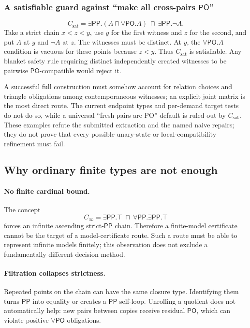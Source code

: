 \documentclass[11pt]{article}
\newcommand{\PO}{\ensuremath{\mathsf{PO}}}
\newcommand{\PP}{\ensuremath{\mathsf{PP}}}
\begin{document}
\subsubsection{A satisfiable guard against ``make all cross-pairs \PO''}

\[
C_{\mathrm{sat}}=
\exists\PP.(A\sqcap\forall\PO.A)\ \sqcap\ \exists\PP.\neg A.
\]
Take a strict chain \(x<z<y\), use \(y\) for the first witness and \(z\) for
the second, and put \(A\) at \(y\) and \(\neg A\) at \(z\).  The witnesses
must be distinct.  At \(y\), the \(\forall\PO.A\)
condition is vacuous for these points because \(z<y\).  Thus
\(C_{\mathrm{sat}}\) is satisfiable.  Any blanket safety rule requiring
distinct independently created witnesses to be pairwise \PO-compatible would
reject it.

\begin{verdictbox}
A successful full construction must somehow account for relation choices and
triangle obligations among contemporaneous witnesses; an explicit joint matrix
is the most direct route.  The current endpoint types and per-demand target
tests do not do so, while a universal ``fresh pairs are PO'' default is ruled
out by \(C_{\mathrm{sat}}\).  These examples refute the submitted extraction and
the named naive repairs; they do not prove that every possible unary-state or
local-compatibility refinement must fail.
\end{verdictbox}

\subsection{Why ordinary finite types are not enough}

\paragraph{No finite cardinal bound.}
The concept
\[
C_{\infty}=\exists\PP.\top\ \sqcap\
\forall\PP.\exists\PP.\top
\]
forces an infinite ascending strict-\PP{} chain.  Therefore a finite-model
certificate cannot be the target of a model-certificate route.  Such a route
must be able to
represent infinite models finitely; this observation does not exclude a
fundamentally different decision method.

\paragraph{Filtration collapses strictness.}
Repeated points on the chain can have the same closure type.  Identifying them
turns \PP{} into equality or creates a \PP{} self-loop.  Unrolling a quotient
does not automatically help: new pairs between copies receive residual \PO,
which can violate positive \(\forall\PO\) obligations.
\end{document}
